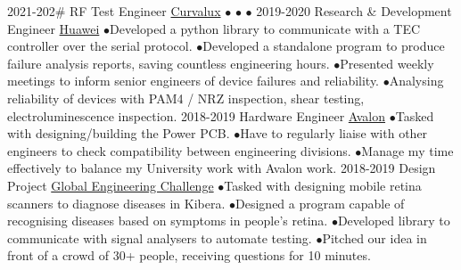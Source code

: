 \documentclass[9pt]{developercv} %
\begin{document}
\begin{entrylist}
	\entry
		{2021-202\#}
		{RF Test Engineer}
		{\href{https://Curvalux.com}{Curvalux}}
		{
			$\bullet$\hspace*{0.5cm}\lorem\newline
			$\bullet$\hspace*{0.5cm}\lorem\newline
			$\bullet$\hspace*{0.5cm}\lorem
		}
	\entry
		{2019-2020}
		{Research \& Development Engineer}
		{\href{https://www.huawei.com/uk/contact-us}{Huawei}}
		{
			$\bullet$\hspace*{0.5cm}Developed a python library to communicate with a TEC controller over the serial protocol.\newline
			$\bullet$\hspace*{0.5cm}Developed a standalone program to produce failure analysis reports, saving countless engineering hours.\newline
			$\bullet$\hspace*{0.5cm}Presented weekly meetings to inform senior engineers of device failures and reliability.\newline
			$\bullet$\hspace*{0.5cm}Analysing reliability of devices with PAM4 / NRZ inspection, shear testing, electroluminescence inspection.
		}
		\entry
		{2018-2019}
		{Hardware Engineer}
		{\href{https://avalonrov.wixsite.com/avalonrov}{Avalon}}
		{
			$\bullet$\hspace*{0.5cm}Tasked with designing/building the Power PCB.\newline
			$\bullet$\hspace*{0.5cm}Have to regularly liaise with other engineers to check compatibility between engineering divisions.\newline
			$\bullet$\hspace*{0.5cm}Manage my time effectively to balance my University work with Avalon work.
		}
		\entry
		{2018-2019}
		{Design Project}
		{\href{https://www.sheffield.ac.uk/engineering/study/global-engineering-challenge}{Global Engineering Challenge}}
		{
			$\bullet$\hspace*{0.5cm}Tasked with designing mobile retina scanners to diagnose diseases in Kibera.\newline
			$\bullet$\hspace*{0.5cm}Designed a program capable of recognising diseases based on symptoms in people's retina.\newline
			$\bullet$\hspace*{0.5cm}Developed library to communicate with signal analysers to automate testing.\newline
			$\bullet$\hspace*{0.5cm}Pitched our idea in front of a crowd of 30+ people, receiving questions for 10 minutes.
		}	
\end{entrylist}
\end{document}

